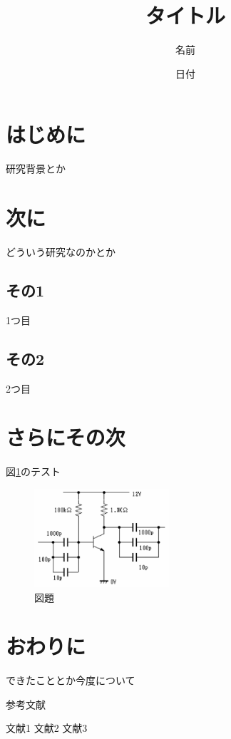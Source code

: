 \documentclass[a4paper,twocolumn,9pt]{jsarticle} %
\title{タイトル}
\author{名前}
\date{日付} %
\begin{document}
\maketitle

\section{はじめに}
研究背景とか

\section{次に}
どういう研究なのかとか

\subsection{その1}
1つ目

\subsection{その2}
2つ目

\section{さらにその次}
図\ref{fig1}のテスト

\begin{figure}[htbp]
 \begin{center}
  \includegraphics[clip,width=50mm]{fig.eps} %
   \caption{図題}
   \label{fig1}
 \end{center}
\end{figure}

\section{おわりに}
できたこととか今度について

参考文献\cite{bunken1}

\begin{thebibliography}{9}
  文献1
  文献2
  文献3
\end{thebibliography}
\end{document}
